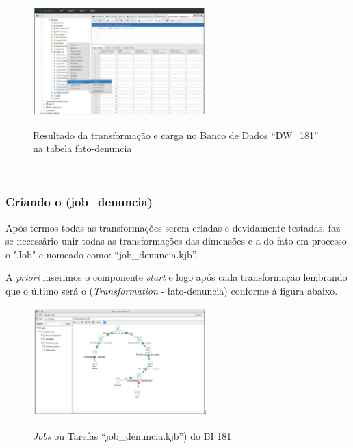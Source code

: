 \begin{figure}[H]
	\vspace*{0,2cm}
    \centering
    \caption{Resultado da transforma\c{c}\~{a}o e carga no Banco de Dados ``DW\_181'' na tabela fato-denuncia}
    \includegraphics[width=0.6\textwidth]{./04-figuras/figura-resultado-fato-denuncia}
    \label{fig:ilustfigresultadofatodenuncia}
\end{figure}
\vspace*{-0,9cm}
{\raggedright {}} \\

\subsubsection{Criando o  (job\_denuncia)}

Ap\'os termos todas as transforma\c{c}\~{o}es serem criadas e devidamente testadas, faz-se necess\'{a}rio unir todas as transforma\c{c}\~{o}es das dimens\~{o}es e a do fato em processo o "Job" e nomeado como: ``job\_denuncia.kjb''. 

A \textit{priori} inserimos o componente \textit{start} e logo ap\'os cada transforma\c{c}\~{a}o lembrando que o último ser\'{a} o (\textit{Transformation} - fato-denuncia) conforme \`{a} figura abaixo.

\begin{figure}[H]
	\vspace*{0,2cm}
    \centering
    \caption{\textit{Jobs} ou Tarefas ``job\_denuncia.kjb'') do BI 181}
    \includegraphics[width=0.6\textwidth]{./04-figuras/figura-job}
    \label{fig:ilustfigjob}
\end{figure}
\vspace*{-0,9cm}
{\raggedright {}} \\

